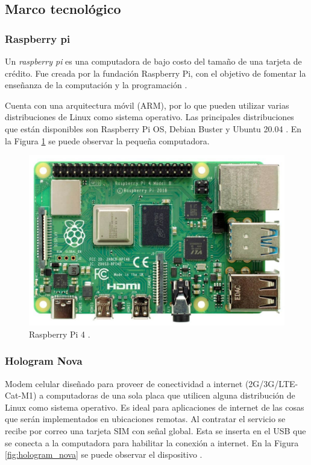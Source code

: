 \subsection{Marco tecnológico}

\subsubsection{Raspberry pi}
Un \textit{raspberry pi} es una computadora de bajo costo del tamaño de una tarjeta de crédito. Fue creada por la fundación Raspberry Pi, con el objetivo de fomentar la enseñanza de la computación y la programación \cite{what_is_raspberry}.

Cuenta con una arquitectura móvil (ARM), por lo que pueden utilizar varias distribuciones de Linux como sistema operativo. Las principales distribuciones que están disponibles son Raspberry Pi OS, Debian Buster y Ubuntu 20.04 \cite{raspberry_os}. En la Figura \ref{fig:raspberry} se puede observar la pequeña computadora.

\begin{figure}[!ht]
    \centering
    \includegraphics[width=.50\linewidth]{imagenes/raspberry_pi_2.png}
    \caption{Raspberry Pi 4 \cite{what_is_raspberry}.}
    \label{fig:raspberry}
\end{figure}

\subsubsection{Hologram Nova}
Modem celular diseñado para proveer de conectividad a internet (2G/3G/LTE-Cat-M1) a computadoras de una sola placa que utilicen alguna distribución de Linux como sistema operativo. Es ideal para aplicaciones de internet de las cosas que serán implementados en ubicaciones remotas. Al contratar el servicio se recibe por correo una tarjeta SIM con señal global. Esta se inserta en el USB que se conecta a la computadora para habilitar la conexión a internet. En la Figura \ref{fig:hologram_nova} se puede observar el dispositivo \cite{hologram_nova}.

